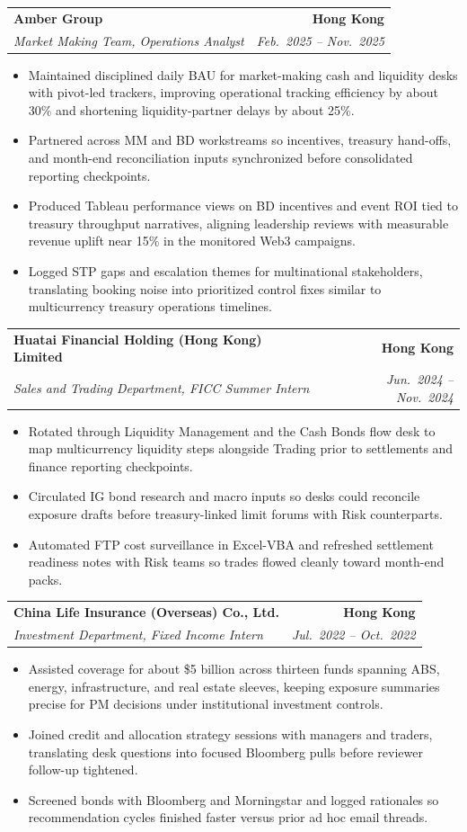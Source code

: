 \documentclass[9pt,a4paper]{extarticle}
\makeatletter
\newcommand{\resumeSubheading}[4]{%
  \vspace{0.6em}%
  \begin{tabular*}{\textwidth}{l@{\extracolsep{\fill}}r}
    \textbf{#1} & \textbf{#2} \\
    \textit{\small #3} & \textit{\small #4} \\
  \end{tabular*}\vspace{0.32em}}
\makeatother
\begin{document}
\resumeSubheading{Amber Group}{Hong Kong}{Market Making Team, Operations Analyst}{Feb.\ 2025 -- Nov.\ 2025}
\begin{itemize}
  \item Maintained disciplined daily BAU for market-making cash and liquidity desks with pivot-led trackers, improving operational tracking efficiency by about 30\% and shortening liquidity-partner delays by about 25\%.
  \item Partnered across MM and BD workstreams so incentives, treasury hand-offs, and month-end reconciliation inputs synchronized before consolidated reporting checkpoints.
  \item Produced Tableau performance views on BD incentives and event ROI tied to treasury throughput narratives, aligning leadership reviews with measurable revenue uplift near 15\% in the monitored Web3 campaigns.
  \item Logged STP gaps and escalation themes for multinational stakeholders, translating booking noise into prioritized control fixes similar to multicurrency treasury operations timelines.
\end{itemize}

\resumeSubheading{Huatai Financial Holding (Hong Kong) Limited}{Hong Kong}{Sales and Trading Department, FICC Summer Intern}{Jun.\ 2024 -- Nov.\ 2024}
\begin{itemize}
  \item Rotated through Liquidity Management and the Cash Bonds flow desk to map multicurrency liquidity steps alongside Trading prior to settlements and finance reporting checkpoints.
  \item Circulated IG bond research and macro inputs so desks could reconcile exposure drafts before treasury-linked limit forums with Risk counterparts.
  \item Automated FTP cost surveillance in Excel-VBA and refreshed settlement readiness notes with Risk teams so trades flowed cleanly toward month-end packs.
\end{itemize}

\resumeSubheading{China Life Insurance (Overseas) Co., Ltd.}{Hong Kong}{Investment Department, Fixed Income Intern}{Jul.\ 2022 -- Oct.\ 2022}
\begin{itemize}
  \item Assisted coverage for about \$5 billion across thirteen funds spanning ABS, energy, infrastructure, and real estate sleeves, keeping exposure summaries precise for PM decisions under institutional investment controls.
  \item Joined credit and allocation strategy sessions with managers and traders, translating desk questions into focused Bloomberg pulls before reviewer follow-up tightened.
  \item Screened bonds with Bloomberg and Morningstar and logged rationales so recommendation cycles finished faster versus prior ad hoc email threads.
\end{itemize}
\end{document}
